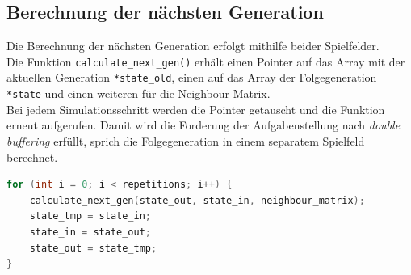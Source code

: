 \documentclass[german,plainarticle,hyperref,utf8]{zihpub}
\begin{document}
	\subsection{Berechnung der nächsten Generation}
	Die Berechnung der nächsten Generation erfolgt mithilfe beider Spielfelder.\\ Die Funktion \texttt{calculate\_next\_gen()} erhält einen Pointer auf das Array mit der aktuellen Generation \texttt{*state\_old}, einen auf das Array der Folgegeneration \texttt{*state} und einen weiteren für die Neighbour Matrix.\\
	Bei jedem Simulationsschritt werden die Pointer getauscht und die Funktion erneut aufgerufen. Damit wird die Forderung der Aufgabenstellung nach \textit{double buffering} erfüllt, sprich die Folgegeneration in einem separatem Spielfeld berechnet.
	\begin{lstlisting}[language=C, caption=Vertauschen der Pointer vor jedem Funktionsaufruf (vereinfacht)]
for (int i = 0; i < repetitions; i++) {
	calculate_next_gen(state_out, state_in, neighbour_matrix);
	state_tmp = state_in;
	state_in = state_out;
	state_out = state_tmp;
}\end{lstlisting}
\end{document}
